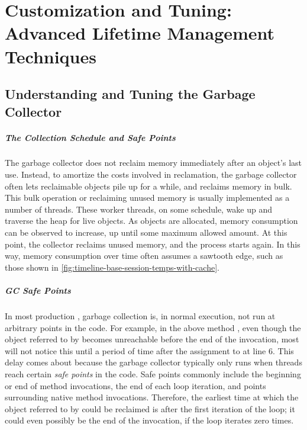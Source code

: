 \chapter{Customization and Tuning: Advanced Lifetime Management Techniques}
\label{chapter:advanced-lifetime-techniques}

\section{Understanding and Tuning the Garbage Collector}

\paragraph{The Collection Schedule and Safe Points}
The garbage collector does not reclaim memory immediately after an object's last
use. Instead, to amortize the costs involved in reclamation, the garbage
collector often lets reclaimable objects pile up for a while, and reclaims memory
in bulk. This bulk operation or reclaiming unused memory is usually implemented
as a number of threads. These worker threads, on some schedule, wake up and
traverse the heap for live objects. As objects are allocated, memory consumption
can be observed to increase, up until some maximum allowed amount. At this point,
the collector reclaims unused memory, and the process starts again. In this way,
memory consumption over time often assumes a sawtooth edge, such as those shown
in \autoref{fig:timeline-base-session-temps-with-cache}.

\paragraph{GC Safe Points}

In most production \jres, garbage collection is, in normal execution, not run at
arbitrary points in the code. For example, in the above method ,
even though the object referred to by  becomes
unreachable before the end of the invocation, most \jres will not notice this
until a period of time after the assignment to  at line 6. This delay
comes about because the garbage collector typically only runs when threads reach
certain \emph{safe points} in the code. Safe points commonly include the
beginning or end of method invocations, the end of each loop iteration, and
points surrounding native method invocations. Therefore, the earliest time at
which the object referred to by  could be reclaimed
is after the first iteration of the loop; it could even possibly be the end of
the invocation, if the loop iterates zero times.

